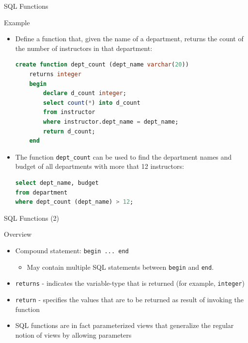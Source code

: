 \documentclass[aspectratio=169, xcolor=dvipsnames]{beamer}
\begin{document}
\begin{frame}[fragile]{SQL Functions}
    \begin{exampleblock}{Example}
        \begin{itemize}[<+->]
            \item Define a function that, given the name of a department, returns the count of the number of instructors in that department:
            \begin{lstlisting}[language=SQL, basicstyle=\ttfamily\scriptsize]
create function dept_count (dept_name varchar(20))
    returns integer
    begin
        declare d_count integer;
        select count(*) into d_count 
        from instructor 
        where instructor.dept_name = dept_name;
        return d_count; 
    end
            \end{lstlisting}
            \item The function \texttt{dept\_count} can be used to find the department names and budget of all departments with more that 12 instructors:
            \begin{lstlisting}[language=SQL, basicstyle=\ttfamily\scriptsize]
select dept_name, budget 
from department
where dept_count (dept_name) > 12;
            \end{lstlisting}
        \end{itemize}
    \end{exampleblock}
\end{frame}

\begin{frame}{SQL Functions (2)}
    \begin{block}{Overview}
        \begin{itemize}[<+->]
            \item Compound statement: \texttt{begin ... end}
            \begin{itemize}
                \item[$\triangleright$] May contain multiple SQL statements between \texttt{begin} and \texttt{end}.
            \end{itemize}
            \item \texttt{returns} - indicates the variable-type that is returned (for example, \texttt{integer})
            \item \texttt{return} - specifies the values that are to be returned as result of invoking the function
            \item SQL functions are in fact parameterized views that generalize the regular notion of views by allowing parameters
        \end{itemize}
    \end{block}
\end{frame}
\end{document}
